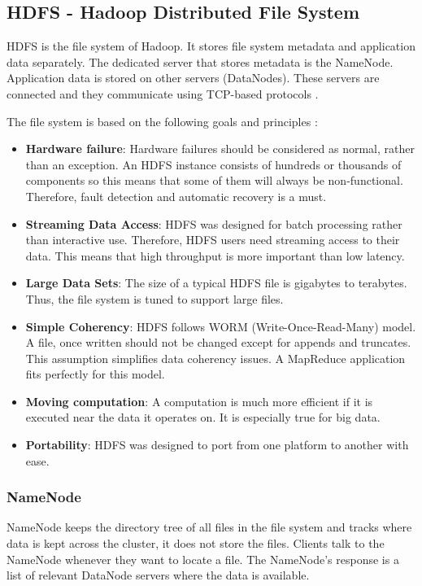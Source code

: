 \subsection{HDFS - Hadoop Distributed File System}
HDFS is the file system of Hadoop. It stores file system metadata and application data separately. The dedicated server that stores metadata is the NameNode. Application data is stored on other servers (DataNodes). These servers are connected and they communicate using TCP-based protocols \cite{Shvachko:2010:HDF:1913798.1914427}. 

The file system is based on the following goals and principles \cite{HDFS-docs}:
\begin{itemize}
	\item \textbf{Hardware failure}: Hardware failures should be considered as normal, rather than an exception. An HDFS instance consists of hundreds or thousands of components so this means that some of them will always be non-functional. Therefore, fault detection and automatic recovery is a must.
	\item \textbf{Streaming Data Access}: HDFS was designed for batch processing rather than interactive use. Therefore, HDFS users need streaming access to their data. This means that high throughput is more important than low latency.
	\item \textbf{Large Data Sets}: The size of a typical HDFS file is gigabytes to terabytes. Thus, the file system is tuned to support large files. 
	\item \textbf{Simple Coherency}: HDFS follows WORM (Write-Once-Read-Many) model. A file, once written should not be changed except for appends and truncates.  This assumption simplifies data coherency issues. A MapReduce application fits perfectly for this model.
	\item \textbf{Moving computation}: A computation is much more efficient if it is executed near the data it operates on. It is especially true for big data. 
	\item \textbf{Portability}: HDFS was designed to port from one platform to another with ease. 
\end{itemize}
\subsubsection*{NameNode}
NameNode keeps the directory tree of all files in the file system and tracks where data is kept across the cluster, it does not store the files. Clients talk to the NameNode whenever they want to locate a file. The NameNode's response is a list of relevant DataNode servers where the data is available. 

